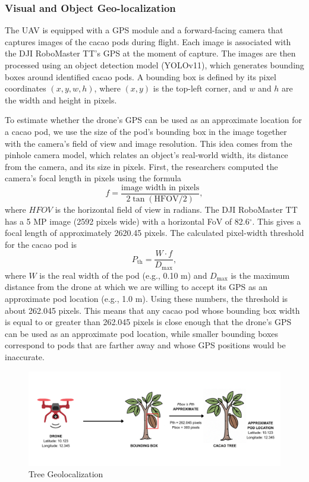\subsubsection*{Visual and Object Geo-localization}

The UAV is equipped with a GPS module and a forward-facing camera that captures images of the cacao pods during flight. Each image is associated with the DJI RoboMaster TT’s GPS at the moment of capture. The images are then processed using an object detection model (YOLOv11), which generates bounding boxes around identified cacao pods. A bounding box is defined by its pixel coordinates $(x, y, w, h)$, where $(x, y)$ is the top-left corner, and $w$ and $h$ are the width and height in pixels.

To estimate whether the drone's GPS can be used as an approximate location for a cacao pod, we use the size of the pod's bounding box in the image together with the camera's field of view and image resolution. This idea comes from the pinhole camera model, which relates an object's real-world width, its distance from the camera, and its size in pixels. First, the researchers computed the camera's focal length in pixels using the formula
\[
f = \frac{\text{image width in pixels}}{2 \tan(\text{HFOV}/2)},
\]
where $HFOV$ is the horizontal field of view in radians. The DJI RoboMaster TT has a 5 MP image (2592 pixels wide) with a horizontal FoV of 82.6$^\circ$. This gives a focal length of approximately 2620.45 pixels. The calculated pixel-width threshold for the cacao pod is
\[
P_{\text{th}} = \frac{W \cdot f}{D_{\max}},
\]
where $W$ is the real width of the pod (e.g., 0.10 m) and $D_{\max}$ is the maximum distance from the drone at which we are willing to accept its GPS as an approximate pod location (e.g., 1.0 m). Using these numbers, the threshold is about 262.045 pixels. This means that any cacao pod whose bounding box width is equal to or greater than 262.045 pixels is close enough that the drone's GPS can be used as an approximate pod location, while smaller bounding boxes correspond to pods that are farther away and whose GPS positions would be inaccurate.

\begin{figure}[H]
	\centering
	\caption{Tree Geolocalization}
	\label{fig:tree}
	\includegraphics[width=1\textwidth]{figures/Tree Geolocalization.pdf}
\end{figure}

